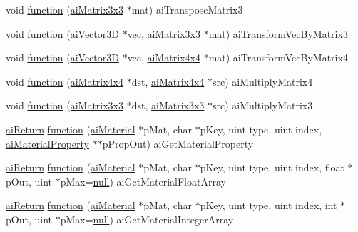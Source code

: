 \begin{DoxyCompactItemize}
void \hyperlink{namespaceassimp_1_1api_abcc340afe1c4c8f3ab5fddabbc107c07}{function} (\hyperlink{structai_matrix3x3}{ai\+Matrix3x3} $\ast$mat) ai\+Transpose\+Matrix3
\item 
void \hyperlink{namespaceassimp_1_1api_a005b01872418f688d89ac0fd00f0e134}{function} (\hyperlink{structai_vector3_d}{ai\+Vector3\+D} $\ast$vec, \hyperlink{structai_matrix3x3}{ai\+Matrix3x3} $\ast$mat) ai\+Transform\+Vec\+By\+Matrix3
\item 
void \hyperlink{namespaceassimp_1_1api_a6edacefaa630b4e7c4a1b1d20745a342}{function} (\hyperlink{structai_vector3_d}{ai\+Vector3\+D} $\ast$vec, \hyperlink{structai_matrix4x4}{ai\+Matrix4x4} $\ast$mat) ai\+Transform\+Vec\+By\+Matrix4
\item 
void \hyperlink{namespaceassimp_1_1api_aa5e391cbe1d1a6786024ef39f32e4ead}{function} (\hyperlink{structai_matrix4x4}{ai\+Matrix4x4} $\ast$dst, \hyperlink{structai_matrix4x4}{ai\+Matrix4x4} $\ast$src) ai\+Multiply\+Matrix4
\item 
void \hyperlink{namespaceassimp_1_1api_a61ae379d4d7546884e27fc3d30c26e51}{function} (\hyperlink{structai_matrix3x3}{ai\+Matrix3x3} $\ast$dst, \hyperlink{structai_matrix3x3}{ai\+Matrix3x3} $\ast$src) ai\+Multiply\+Matrix3
\item 
\hyperlink{namespaceassimp_1_1types_ac24c8c8413fff5748d90ed5ac59f36ec}{ai\+Return} \hyperlink{namespaceassimp_1_1api_aa99170042116ae58ae78b61c7a571730}{function} (\hyperlink{structassimp_1_1material_1_1ai_material}{ai\+Material} $\ast$p\+Mat, char $\ast$p\+Key, uint type, uint index, \hyperlink{structassimp_1_1material_1_1ai_material_property}{ai\+Material\+Property} $\ast$$\ast$p\+Prop\+Out) ai\+Get\+Material\+Property
\item 
\hyperlink{namespaceassimp_1_1types_ac24c8c8413fff5748d90ed5ac59f36ec}{ai\+Return} \hyperlink{namespaceassimp_1_1api_a62910ae5faa1f84e21969a0073dd63c4}{function} (\hyperlink{structassimp_1_1material_1_1ai_material}{ai\+Material} $\ast$p\+Mat, char $\ast$p\+Key, uint type, uint index, float $\ast$p\+Out, uint $\ast$p\+Max=\hyperlink{_ice_types_8h_ac97b8ee753e4405397a42ad5799b0f9e}{null}) ai\+Get\+Material\+Float\+Array
\item 
\hyperlink{namespaceassimp_1_1types_ac24c8c8413fff5748d90ed5ac59f36ec}{ai\+Return} \hyperlink{namespaceassimp_1_1api_a3b95f7381bd9863158c5028b69f0c7b4}{function} (\hyperlink{structassimp_1_1material_1_1ai_material}{ai\+Material} $\ast$p\+Mat, char $\ast$p\+Key, uint type, uint index, int $\ast$p\+Out, uint $\ast$p\+Max=\hyperlink{_ice_types_8h_ac97b8ee753e4405397a42ad5799b0f9e}{null}) ai\+Get\+Material\+Integer\+Array
$$
\end{DoxyCompactItemize}
